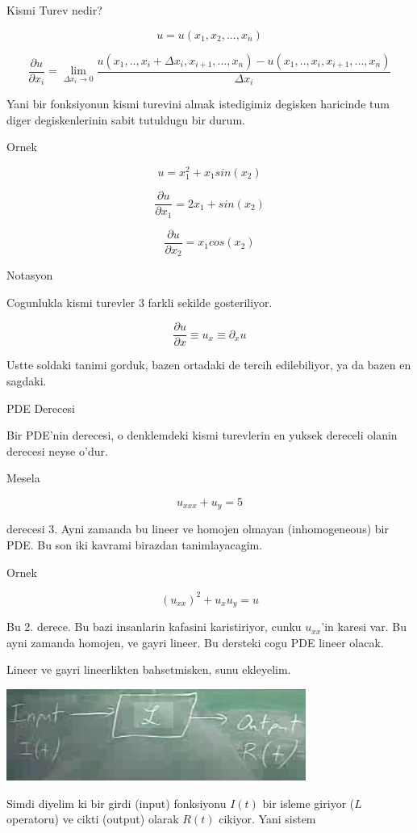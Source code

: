 \documentclass[12pt,fleqn]{article}
\begin{document}
Kismi Turev nedir? 

\[ u = u(x_1, x_2,...,x_n) \]

\[ 
\frac{\partial u}{\partial x_i} = 
\lim_{\Delta x_i \to 0} 
\frac{
u(x_1,..,x_i+\Delta x_i,x_{i+1},...,x_n) - u(x_1,..,x_i,x_{i+1},...,x_n)}
{\Delta x_i}  \]

Yani bir fonksiyonun kismi turevini almak istedigimiz degisken haricinde
tum diger degiskenlerinin sabit tutuldugu bir durum. 

Ornek

\[ u = x_1^2 + x_1sin(x_2) \]

\[ 
\frac{\partial u}{\partial x_1} = 2x_1 + sin(x_2)
 \]

\[ 
\frac{\partial u}{\partial x_2} = x_1 cos(x_2)
 \]

Notasyon

Cogunlukla kismi turevler 3 farkli sekilde gosteriliyor. 

\[ \frac{\partial u}{\partial x} \equiv u_x \equiv \partial_x u \]

Ustte soldaki tanimi gorduk, bazen ortadaki de tercih edilebiliyor, ya da
bazen en sagdaki. 

PDE Derecesi

Bir PDE'nin derecesi, o denklemdeki kismi turevlerin en yuksek dereceli
olanin derecesi neyse o'dur.

Mesela

\[ u_{xxx} + u_y = 5 \]

derecesi 3. Ayni zamanda bu lineer ve homojen olmayan (inhomogeneous) bir
PDE. Bu son iki kavrami birazdan tanimlayacagim. 

Ornek 

\[ (u_{xx})^2 + u_xu_y = u \]

Bu 2. derece. Bu bazi insanlarin kafasini karistiriyor, cunku $u_{xx}$'in
karesi var. Bu ayni zamanda homojen, ve gayri lineer. Bu dersteki cogu PDE
lineer olacak. 

Lineer ve gayri lineerlikten bahsetmisken, sunu ekleyelim. 

\includegraphics[height=3cm]{1_01.png}

Simdi diyelim ki bir girdi (input) fonksiyonu $I(t)$ bir isleme giriyor
($L$ operatoru) ve cikti (output) olarak $R(t)$ cikiyor. Yani sistem
\end{document}
